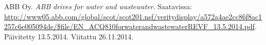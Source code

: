 \documentclass[finnish,12pt,a4paper,pdftex,elec,utf8]{aaltothesis}
\begin{document}
\begin{thebibliography}{99}
ABB Oy. \textit{ABB drives for water and wastewater}. Saatavissa: \url{http://www05.abb.com/global/scot/scot201.nsf/veritydisplay/a572a4ae2cc86f8ac1257c6e005094de/$file/EN_ACQ810forwaterandwastewaterREVF_13.5.2014.pdf}. Päivitetty 13.5.2014. Viitattu 26.11.2014.











































\end{thebibliography}



\clearpage

\thesisappendix
\end{document}
